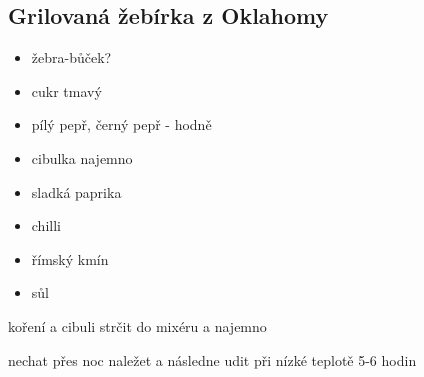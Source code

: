 \documentclass[10pt,a4paper]{article}
\newenvironment{myitemize}
{ \begin{itemize}
    \setlength{\itemsep}{0pt}
    \setlength{\parskip}{0pt}
    \setlength{\parsep}{0pt}     }
{ \end{itemize}                  }
\begin{document}
\subsection{Grilovaná žebírka z Oklahomy}
\begin{minipage}[t]{0,5\textwidth}
\begin{myitemize} 
\item žebra-bůček?
\item cukr tmavý
\item pílý pepř, černý pepř - hodně
\item cibulka najemno
\item sladká paprika
\item chilli
\item římský kmín
\item sůl
\end{myitemize}
\end{minipage}
\begin{minipage}[t]{0,5\textwidth}
koření a cibuli strčit do mixéru a najemno

nechat přes noc naležet a následne udit při nízké teplotě 5-6 hodin
\end{minipage}
\end{document}
